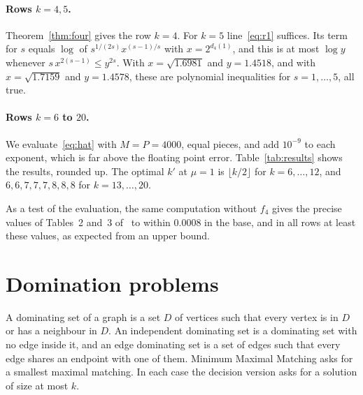 \documentclass[11pt]{article}
\theoremstyle{remark}
\begin{document}
\paragraph{Rows $k = 4, 5$.} Theorem~\ref{thm:four} gives the row $k = 4$. For $k = 5$ line~\eqref{eq:r1} suffices. Its term for $s$ equals $\log$ of $s^{1/(2s)} x^{(s-1)/s}$ with $x = 2^{d_4(1)}$, and this is at most $\log y$ whenever $s\, x^{2(s-1)} \le y^{2s}$. With $x = \sqrt{1.6981}$ and $y = 1.4518$, and with $x = \sqrt{1.7159}$ and $y = 1.4578$, these are polynomial inequalities for $s = 1, \dots, 5$, all true.

\paragraph{Rows $k = 6$ to $20$.} We evaluate~\eqref{eq:hat} with $M = P = 4000$, equal pieces, and add $10^{-9}$ to each exponent, which is far above the floating point error. Table~\ref{tab:results} shows the results, rounded up. The optimal $k'$ at $\mu = 1$ is $\lfloor k/2 \rfloor$ for $k = 6, \dots, 12$, and $6, 6, 7, 7, 7, 8, 8, 8$ for $k = 13, \dots, 20$.

As a test of the evaluation, the same computation without $f_4$ gives the precise values of Tables~2 and~3 of~\cite{SM22} to within $0.0008$ in the base, and in all rows at least these values, as expected from an upper bound.

\section{Domination problems}\label{sec:dom}

A dominating set of a graph is a set $D$ of vertices such that every vertex is in $D$ or has a neighbour in $D$. An independent dominating set is a dominating set with no edge inside it, and an edge dominating set is a set of edges such that every edge shares an endpoint with one of them. Minimum Maximal Matching asks for a smallest maximal matching. In each case the decision version asks for a solution of size at most $k$.
\end{document}
